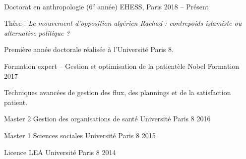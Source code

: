 
\begin{cventries}
  \cventry
    {Doctorat en anthropologie (6\textsuperscript{e} année)}
    {EHESS, Paris}
    {}
    {2018 -- Présent}
    {
      \begin{cvitems}
        \item Thèse : \emph{Le mouvement d'opposition algérien Rachad : contrepoids islamiste ou alternative politique ?}
        \item Première année doctorale réalisée à l'Université Paris 8.
      \end{cvitems}
    }

  \cventry
    {Formation expert -- Gestion et optimisation de la patientèle}
    {Nobel Formation}
    {}
    {2017}
    {
      \begin{cvitems}
        \item Techniques avancées de gestion des flux, des plannings et de la satisfaction patient.
      \end{cvitems}
    }

  \cventry
    {Master 2 Gestion des organisations de santé}
    {Université Paris 8}
    {}
    {2016}
    {}

  \cventry
    {Master 1 Sciences sociales}
    {Université Paris 8}
    {}
    {2015}
    {}

  \cventry
    {Licence LEA}
    {Université Paris 8}
    {}
    {2014}
    {}
\end{cventries}
